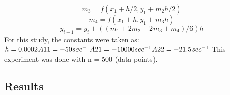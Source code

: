 \documentclass[10pt,journal,cspaper,compsoc]{IEEEtran}
\begin{document}
  \begin{equation*}
    m_3 = f(x_1 + h/2, y_1 + m_2 h/2)
  \end{equation*}
  \begin{equation*}
    m_4 = f(x_1 +h, y_1 + m_3 h)
  \end{equation*}
  \begin{equation*}
    y_{i+1} = y_i + ( (m_1 + 2m_2 + 2m_3 + m_4)/6)h
  \end{equation*}
  For this study,  the constants were taken as:\\
  \begin{math}
  h = 0.0002\\
  A11 = -50 sec^{-1}\\
  A21 = -10000 sec^{-1}\\
  A22 = -21.5 sec^{-1}\\
  \end{math}
  This experiment was done with n = 500 (data points).
  \cite{lab2}
  \subsection{Results}
\end{document}
